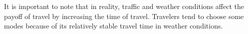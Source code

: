 It is important to note that in reality, traffic and weather conditions affect the payoff of travel by increasing the time of travel. Travelers tend to choose some modes because of its relatively stable travel time in weather conditions.


